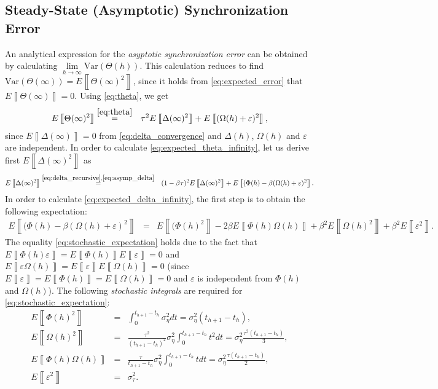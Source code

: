 \documentclass[journal,draftcls,onecolumn,12pt,twoside]{IEEEtranTCOM}
\newcommand{\expected}[1]{E\left\llbracket #1 \right\rrbracket}
\begin{document}
\subsection{Steady-State (Asymptotic) Synchronization Error}
\label{sec:app_b}
An analytical expression for the \emph{asyptotic 
	synchronization error} can be obtained by calculating 
$\underset{h\rightarrow \infty}{\lim}\mathrm{Var}(\Theta(h))$. This 
calculation reduces to find 
$\mathrm{Var}(\Theta(\infty))=\expected{\Theta(\infty)^2}$, since it holds 
from 
\eqref{eq:expected_error} that $\expected{\Theta(\infty)}=0$. Using 
\eqref{eq:theta}, we 
get
\begin{eqnarray}
\expected{\Theta(\infty)^2} &\overset{\eqref{eq:theta}}{=}& 
\tau^2\expected{\Delta(\infty)^2}  
+\expected{(\Omega(h)+\varepsilon)^2},\label{eq:expected_theta_infinity}
\end{eqnarray}
since $\expected{\Delta(\infty)}=0$ from \eqref{eq:delta_convergence} and 
$\Delta(h)$, $\Omega(h)$ and $\varepsilon$ are independent. 
In order to calculate \eqref{eq:expected_theta_infinity}, let us derive first 
$\expected{\Delta(\infty)^2}$ as
\begin{eqnarray}
\expected{\Delta(\infty)^2} 
&\overset{\eqref{eq:delta_recursive},\eqref{eq:asymp_delta}}{=}& 
(1-\beta\tau)^2	
\expected{\Delta(\infty)^2}  
+\expected{(\Phi(h)-\beta(\Omega(h)+\varepsilon)^2} 
\label{eq:expected_delta_infinity}.
\end{eqnarray}
In order to calculate \eqref{eq:expected_delta_infinity}, the first step is to 
obtain the following expectation:
\begin{eqnarray}
\expected{(\Phi(h)\!-\!\beta(\Omega(h)\!+\!\varepsilon)^2} 
&\!\!\!\!=\!\!\!\!&
\expected{(\Phi(h)^2}
\!-\!2\beta\expected{\Phi(h)\Omega(h)} 
\!+\!\beta^2\expected{\Omega(h)^2}\!+\!\beta^2\expected{\varepsilon^2}. 
\label{eq:stochastic_expectation}
\end{eqnarray}
The equality \eqref{eq:stochastic_expectation} holds due to the fact that 
$\expected{\Phi(h)\varepsilon}=\expected{\Phi(h)}\expected{\varepsilon}=0$ and 
$\expected{\varepsilon\Omega(h)}=\expected{\varepsilon}\expected{\Omega(h)}=0$ 
(since 
$\expected{\varepsilon}=\expected{\Phi(h)}=\expected{\Omega(h)}=0$ and 
$\varepsilon$ is independent from $\Phi(h)$ and $\Omega(h)$). The
following \emph{stochastic integrals} are required for 
\eqref{eq:stochastic_expectation}:
\begin{eqnarray}
\expected{\Phi(h)^2} 
& = & 
\int_{0}^{t_{h+1}-t_h}\sigma_{\eta}^{2}dt =  \sigma_{\eta}^{2}(t_{h+1}-t_h),\\
\expected{\Omega(h)^2} 
& = & 
\frac{\tau^2}{(t_{h+1}-t_h)^2}
\sigma_{\eta}^{2}\int_{0}^{t_{h+1}-t_h}t^2dt = 
\sigma_{\eta}^{2}\frac{\tau^2(t_{h+1}-t_h)}{3},\label{eq:stochastic_integral}\\
\expected{\Phi(h)\Omega(h)} 
& = &
\frac{\tau}{t_{h+1}-t_h}\sigma_{\eta}^{2}\int_{0}^{t_{h+1}-t_h}tdt = 
\sigma_{\eta}^{2}\frac{\tau(t_{h+1}-t_h)}{2}, \\
\expected{\varepsilon^2} 
& = & 
\sigma_{\tau}^{2}.
\end{eqnarray}	
\end{document}
